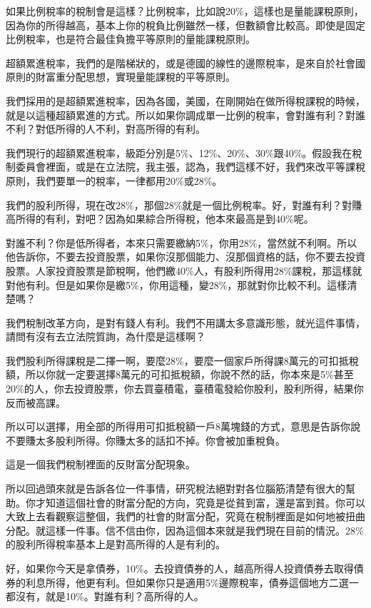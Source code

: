 \documentclass[oneside,sub3section]{ctexbook}
\begin{document}
如果比例稅率的稅制會是這樣？比例稅率，比如說20\%，這樣也是量能課稅原則，因為你的所得越高，基本上你的稅負比例雖然一樣，但數額會比較高。即使是固定比例稅率，也是符合最佳負擔平等原則的量能課稅原則。

超額累進稅率，我們的是階梯狀的，或是德國的線性的邊際稅率，是來自於社會國原則的財富重分配思想，實現量能課稅的平等原則。

我們採用的是超額累進稅率，因為各國，美國，在剛開始在做所得稅課稅的時候，就是以這種超額累進的方式。所以如果你調成單一比例的稅率，會對誰有利？對誰不利？對低所得的人不利，對高所得的有利。

我們現行的超額累進稅率，級距分別是5\%、12\%、20\%、30\%跟40\%。假設我在稅制委員會裡面，或是在立法院，我主張，認為，我們這樣不好，我們來改平等課稅原則，我們要單一的稅率，一律都用20\%或28\%。

我們的股利所得，現在改28\%，那個28\%就是一個比例稅率。好，對誰有利？對賺高所得的有利，對吧？因為如果綜合所得稅，他本來最高是到40\%呢。

對誰不利？你是低所得者，本來只需要繳納5\%，你用28\%，當然就不利啊。所以他告訴你，不要去投資股票，如果你沒那個能力、沒那個資格的話，你不要去投資股票。人家投資股票是節稅啊，他們繳40\%人，有股利所得用28\%課稅，那這樣就對他有利。但是如果你是繳5\%，你用這種，變28\%，那就對你比較不利。這樣清楚嗎？

我們稅制改革方向，是對有錢人有利。我們不用講太多意識形態，就光這件事情，請問有沒有去立法院質詢，為什麼是這樣啊？

我們股利所得課稅是二擇一啊，要麼28\%，要麼一個家戶所得課8萬元的可扣抵稅額，所以你就一定要選擇8萬元的可扣抵稅額，你說不然的話，你本來是5\%甚至20\%的人，你去投資股票，你去買臺積電，臺積電發給你股利，股利所得，結果你反而被高課。

所以可以選擇，用全部的所得用可扣抵稅額一戶8萬塊錢的方式，意思是告訴你說不要賺太多股利所得。你賺太多的話扣不掉。你會被加重稅負。

這是一個我們稅制裡面的反財富分配現象。

所以回過頭來就是告訴各位一件事情，研究稅法絕對對各位腦筋清楚有很大的幫助。你才知道這個社會的財富分配的方向，究竟是從貧到富，還是富到貧。你可以大致上去看觀察這整個，我們的社會的財富分配，究竟在稅制裡面是如何地被扭曲分配。就這樣一件事。信不信由你，因為這個本來就是我們現在目前的情況。28\%的股利所得稅率基本上是對高所得的人是有利的。

好，如果你今天是拿債券，10\%。去投資債券的人，越高所得人投資債券去取得債券的利息所得，他更有利。但如果你只是適用5\%邊際稅率，債券這個地方二選一都沒有，就是10\%。對誰有利？高所得的人。
\end{document}
